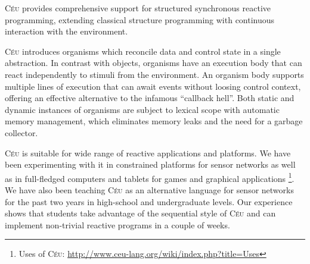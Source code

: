 \documentclass{sigplanconf}
\newcommand{\CEU}{\textsc{C\'{e}u}\xspace}
\newcommand{\1}{\;}
\newcommand{\2}{\;\;}
\newcommand{\3}{\;\;\;}
\newcommand{\5}{\;\;\;\;\;}
\newcommand{\URL}{\small\url}
\begin{document}

\CEU provides comprehensive support for structured synchronous reactive 
programming, extending classical structure programming with continuous 
interaction with the environment.

\CEU introduces organisms which reconcile data and control state in a single 
abstraction.
%
In contrast with objects, organisms have an execution body that can react 
independently to stimuli from the environment.
An organism body supports multiple lines of execution that can await events 
without loosing control context, offering an effective alternative to the 
infamous ``callback hell''.
%
Both static and dynamic instances of organisms are subject to lexical scope 
with automatic memory management, which eliminates memory leaks and the need 
for a garbage collector.

\CEU is suitable for wide range of reactive applications and platforms.
%
We have been experimenting with it in constrained platforms for sensor networks 
as well as in full-fledged computers and tablets for games and graphical 
applications%
\footnote{Uses of \CEU: \URL{http://www.ceu-lang.org/wiki/index.php?title=Uses}}.
%
%
We have also been teaching \CEU as an alternative language for sensor networks 
for the past two years in high-school and undergraduate levels.
%
Our experience shows that students take advantage of the sequential style of 
\CEU and can implement non-trivial reactive programs in a couple of weeks.
\end{document}
